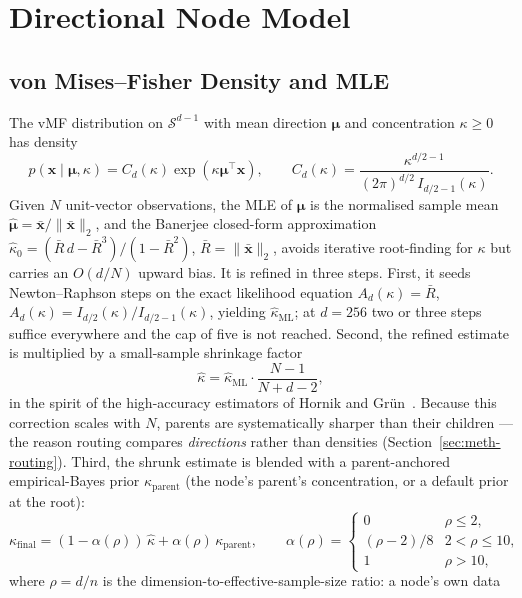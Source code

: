 \section{Directional Node Model}\label{sec:meth-vmf}

\subsection{von Mises--Fisher Density and MLE}

The vMF distribution on $\mathcal{S}^{d-1}$ with mean direction $\boldsymbol{\mu}$ and
concentration $\kappa \geq 0$ has density
\[
p(\mathbf{x} \mid \boldsymbol{\mu}, \kappa)
= C_d(\kappa) \exp\!\left(\kappa \boldsymbol{\mu}^\top \mathbf{x}\right),
\qquad
C_d(\kappa) = \frac{\kappa^{d/2 - 1}}{(2\pi)^{d/2}\, I_{d/2 - 1}(\kappa)}.
\]
Given $N$ unit-vector observations, the MLE of $\boldsymbol{\mu}$ is the normalised
sample mean $\hat{\boldsymbol{\mu}} = \bar{\mathbf{x}} / \|\bar{\mathbf{x}}\|_2$, and the
Banerjee closed-form approximation~\parencite{banerjee2005vmf}
$\hat{\kappa}_{0} = (\bar{R}\, d - \bar{R}^3)/(1 - \bar{R}^2)$,
$\bar{R} = \|\bar{\mathbf{x}}\|_2$, avoids iterative root-finding for $\kappa$ but
carries an $O(d/N)$ upward bias. It is refined in three steps.
First, it seeds Newton--Raphson steps on the exact likelihood equation
$A_d(\kappa) = \bar{R}$, $A_d(\kappa) = I_{d/2}(\kappa)/I_{d/2-1}(\kappa)$, yielding
$\hat{\kappa}_{\text{ML}}$; at $d = 256$ two or three steps suffice everywhere and the
cap of five is not reached.
Second, the refined estimate is multiplied by a small-sample shrinkage factor
\[
\hat{\kappa}
= \hat{\kappa}_{\text{ML}} \cdot \frac{N - 1}{N + d - 2},
\]
in the spirit of the high-accuracy estimators of Hornik and
Gr\"{u}n~\parencite{hornik2014vmf}.
Because this correction scales with $N$, parents are systematically sharper than their
children --- the reason routing compares \emph{directions} rather than densities
(Section~\ref{sec:meth-routing}).
Third, the shrunk estimate is blended with a parent-anchored empirical-Bayes prior
$\kappa_{\text{parent}}$ (the node's parent's concentration, or a default prior at the
root):
\[
\kappa_{\text{final}}
= (1 - \alpha(\rho))\,\hat{\kappa}
+ \alpha(\rho)\,\kappa_{\text{parent}},
\qquad
\alpha(\rho) =
\begin{cases}
0 & \rho \leq 2,\\
(\rho - 2)/8 & 2 < \rho \leq 10,\\
1 & \rho > 10,
\end{cases}
\]
where $\rho = d/n$ is the dimension-to-effective-sample-size ratio: a node's own data
